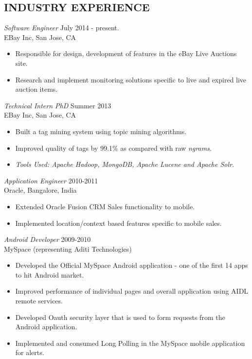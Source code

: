 \documentclass[line,margin]{res}
\begin{document}
\begin{resume}
		\section{INDUSTRY EXPERIENCE} 
		{\sl Software Engineer} \hfill July 2014 - present.\\
		EBay Inc, San Jose, CA
		\begin{itemize}  \itemsep -2pt %
			\item Responsible for design, development of features in the eBay Live Auctions site.
			\item Research and implement monitoring solutions specific to live and expired live auction items. 
		\end{itemize}
		{\sl Technical Intern PhD} \hfill Summer 2013\\
		EBay Inc, San Jose, CA
		\begin{itemize}  \itemsep -2pt %
			\item Built a tag mining system using topic mining algorithms.
			\item Improved quality of tags by 99.1\% as compared with raw \emph{ngrams}.
			\item \emph{Tools Used: Apache Hadoop, MongoDB, Apache Lucene and Apache Solr.}
		\end{itemize}
		{\sl Application Engineer} \hfill 2010-2011 \\
		Oracle, 
		Bangalore, India
		\begin{itemize}  \itemsep -2pt %
			\item Extended Oracle Fusion CRM Sales functionality to mobile.
			\item Implemented location/context based features specific to mobile sales.
		\end{itemize}
		{\sl Android Developer} \hfill            2009-2010 \\
		MySpace (representing Aditi Technologies) 
		\begin{itemize}  \itemsep -2pt %
			\item Developed the Official MySpace Android application - one of the first 14 apps to hit Android market.
			\item Improved performance of individual pages and overall application using AIDL
			remote services.
			\item Developed Oauth security layer that is used to form requests from the Android application. 
			\item Implemented and consumed Long Polling in the MySpace mobile application for alerts.

\end{itemize}
\end{resume}
\end{document}
